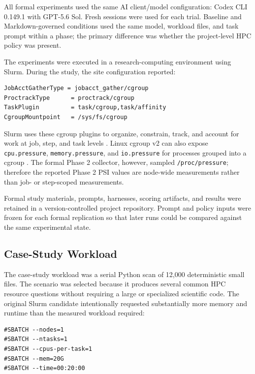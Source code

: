 \documentclass[11pt]{article}
\begin{document}
All formal experiments used the same AI client/model configuration: Codex CLI 0.149.1 with GPT-5.6 Sol. Fresh sessions were used for each trial. Baseline and Markdown-governed conditions used the same model, workload files, and task prompt within a phase; the primary difference was whether the project-level HPC policy was present.

The experiments were executed in a research-computing environment using Slurm. During the study, the site configuration reported:

\begin{lstlisting}
JobAcctGatherType = jobacct_gather/cgroup
ProctrackType      = proctrack/cgroup
TaskPlugin         = task/cgroup,task/affinity
CgroupMountpoint   = /sys/fs/cgroup
\end{lstlisting}

Slurm uses these cgroup plugins to organize, constrain, track, and account for work at job, step, and task levels \cite{slurmcgroups,slurmcgroupv2}. Linux cgroup v2 can also expose \texttt{cpu.pressure}, \texttt{memory.pressure}, and \texttt{io.pressure} for processes grouped into a cgroup \cite{linuxpsi,linuxcgroupv2}. The formal Phase 2 collector, however, sampled \texttt{/proc/pressure}; therefore the reported Phase 2 PSI values are node-wide measurements rather than job- or step-scoped measurements.

Formal study materials, prompts, harnesses, scoring artifacts, and results were retained in a version-controlled project repository. Prompt and policy inputs were frozen for each formal replication so that later runs could be compared against the same experimental state.

\subsection{Case-Study Workload}

The case-study workload was a serial Python scan of 12,000 deterministic small files. The scenario was selected because it produces several common HPC resource questions without requiring a large or specialized scientific code. The original Slurm candidate intentionally requested substantially more memory and runtime than the measured workload required:

\begin{lstlisting}
#SBATCH --nodes=1
#SBATCH --ntasks=1
#SBATCH --cpus-per-task=1
#SBATCH --mem=20G
#SBATCH --time=00:20:00
\end{lstlisting}
\end{document}
